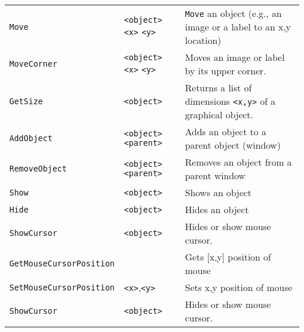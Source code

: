 \begin{longtable}{p{3cm}p{3cm}p{6cm}}
\verb+Move+ &\verb+<object>+ \verb+<x>+ \verb+<y>+& \verb+Move+ an object (e.g., an image or a label to an x,y location) \\ 
\verb+MoveCorner+ &\verb+<object>+ \verb+<x>+ \verb+<y>+& Moves an image or label by its upper corner.\\ 
\verb+GetSize+ &\verb+<object>+ &Returns a list of dimensions \verb+<x,y>+ of a graphical object.\\ 
\verb+AddObject+ &\verb+<object>+ \verb+<parent>+ & Adds an object to a parent object (window)\\ 
\verb+RemoveObject+ &\verb+<object>+ \verb+<parent>+ &Removes an object from a parent window\\ 
\verb+Show+ &\verb+<object>+ &Shows an object\\ 
\verb+Hide+ &\verb+<object>+ &Hides an object\\ 
\verb+ShowCursor+ &\verb+<object>+ &Hides or show mouse cursor.\\
\verb+GetMouseCursorPosition+ & &Gets [x,y] position of mouse\\
\verb+SetMouseCursorPosition+ &\verb+<x>+,\verb+<y>+ &Sets x,y position of mouse\\
\verb+ShowCursor+ &\verb+<object>+ &Hides or show mouse cursor.\\


\end{longtable}
